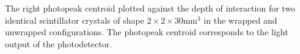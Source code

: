 \label{fig:lightoutput} The right photopeak centroid plotted against the depth of interaction for two identical scintillator crystals of shape $2\times2\times30$mm$^3$ in the wrapped and unwrapped configurations. The photopeak centroid corresponds to the light output of the photodetector.